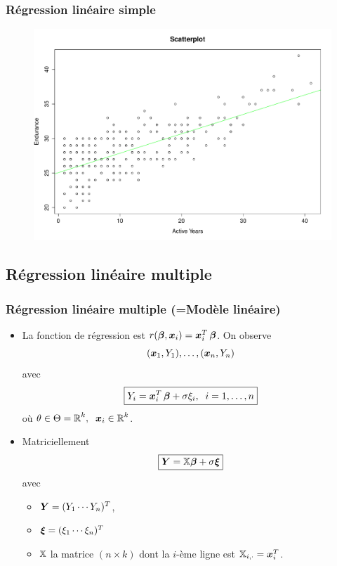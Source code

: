 \begin{frame}
\frametitle{Régression linéaire simple}
\begin{figure}[h]
\begin{center}
\includegraphics[width=0.9\textheight]{ScatterPlotEnduranceActiveYears}
\end{center}
\end{figure}
\end{frame}


\subsection{Régression linéaire multiple}

\begin{frame}
\frametitle{Régression linéaire multiple (=Modèle linéaire)}
\begin{itemize}
\item La fonction de régression est $r(\boldsymbol{\beta},\operatorname{\boldsymbol{x}}_i) = \operatorname{\boldsymbol{x}}_i^T \boldsymbol{\beta}$.
On observe
$$(\operatorname{\boldsymbol{x}}_1,Y_1),\ldots, (\operatorname{\boldsymbol{x}}_n,Y_n)$$
avec
$$\boxed{Y_i = \operatorname{\boldsymbol{x}}_i^T \boldsymbol{\beta}+ \sigma \xi_i,\;\;i=1,\ldots, n}$$
où $\theta \in \Theta = \operatorname{{\mathbb R}}^k,\;\;\operatorname{\boldsymbol{x}}_i \in \operatorname{{\mathbb R}}^k$.
\item \alert{Matriciellement}
$$\boxed{\operatorname{\boldsymbol{Y}} = \mathbb{X}\boldsymbol{\beta} + \sigma \boldsymbol{\xi}}$$
avec
\begin{itemize}
\item \alert<1>{$\operatorname{\boldsymbol{Y}} = (Y_1 \cdots Y_n)^T$},
\item \alert<2>{$\boldsymbol{\xi} = (\xi_1 \cdots \xi_n)^T$}
\item \alert<3>{$\mathbb{X}$ la matrice $(n\times k)$
dont la $i$-ème ligne est $\mathbb{X}_{i,\cdot}= \operatorname{\boldsymbol{x}}_i^T$.}
\end{itemize}
\end{itemize}
\end{frame}





